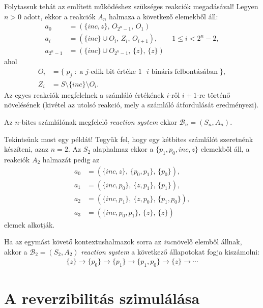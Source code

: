 \documentclass[12pt]{article}
\theoremstyle{definition}
\theoremstyle{remark}
\theoremstyle{plain}
\newcommand{\inc}{\textit{inc}}
\newcommand{\reaction}[3]{
    (#1, \, #2, \, #3)
}
\begin{document}
    Folytassuk tehát az említett működéshez szükséges reakciók megadásával! Legyen $n > 0$ adott, ekkor a reakciók $A_{n}$ halmaza a következő elemekből áll:
    \begin{align*}
        a_{0} &= \reaction{\{ \inc, z \}}{O_{2^{n}-1}}{O_{1}} \\
        a_{i} &= \reaction{\{ \inc \} \cup O_{i}}{Z_{i}}{O_{i + 1}}, \qquad 1 \leq i < 2^{n} - 2, \\
        a_{2^{n}-1} &= \reaction{\{ \inc \} \cup O_{2^{n} - 1}}{\{z\}}{\{z\}}
    \end{align*}
    ahol
    \begin{align*}
        O_{i} &= \{ \; p_{j} \; : \; \text{a $j$-edik bit értéke $1$ $i$ bináris felbontásában} \; \}, \\
        Z_{i} &= S \setminus\{ \inc \} \setminus O_{i}.
    \end{align*}
    Az egyes reakciók megfelelnek a számláló értékének $i$-ről $i + 1$-re történő növelésének (kivétel az utolsó reakció, mely a számláló átfordulását eredményezi).

    Az $n$-bites számlálónak megfelelő \textit{reaction system} ekkor $\mathcal{B}_{n}=(S_{n}, A_{n})$.

    Tekintsünk most egy példát! Tegyük fel, hogy egy kétbites számlálót szeretnénk készíteni, azaz $n = 2$. Az $S_{2}$ alaphalmaz ekkor a $\{p_{1}, p_{0}, \inc, z \}$ elemekből áll, a reakciók $A_{2}$ halmazát pedig az
    \begin{align*}
        a_{0} &= \reaction{\{ \inc, z \}}{\{p_{0}, p_{1}\}}{\{ p_{0} \}}, \\
        a_{1} &= \reaction{\{ \inc, p_{0} \}}{\{ z, p_{1} \}}{\{ p_{1} \}}, \\
        a_{2} &= \reaction{\{ \inc, p_{1} \}}{\{ z, p_{0} \}}{\{ p_{1}, p_{0} \}}, \\
        a_{3} &= \reaction{\{ \inc, p_{0}, p_{1} \}}{\{z\}}{\{z\}}
    \end{align*}
    elemek alkotják.

    Ha az egymást követő kontextushalmazok sorra az \inc növelő elemből állnak, akkor a $\mathcal{B}_{2} = (S_{2}, A_{2})$ \textit{reaction system} a következő állapotokat fogja kiszámolni:
    \begin{align*}
        \{z\} \rightarrow \{p_{0}\} \rightarrow \{p_{1}\} \rightarrow \{p_{1}, p_{0}\} \rightarrow \{z\} \rightarrow \cdots
    \end{align*}

    \section*{A reverzibilitás szimulálása}
\end{document}
